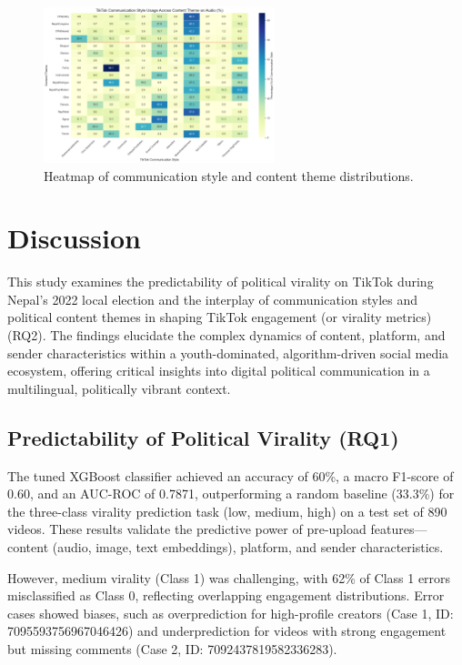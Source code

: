 \documentclass[12pt,a4paper]{report}
\begin{document}
\begin{figure}[ht]
\centering
\includegraphics[width=0.6\textwidth]{figures/RQ2/TikTok_Comm_Heatmap.png}
\caption{Heatmap of communication style and content theme distributions.}
\label{fig:TikTokComm}
\end{figure}


\chapter{Discussion}
\label{chap:discussion}

This study examines the predictability of political virality on TikTok during Nepal’s 2022 local election and the interplay of communication styles and political content themes in shaping TikTok engagement (or virality metrics) (RQ2). The findings elucidate the complex dynamics of content, platform, and sender characteristics within a youth-dominated, algorithm-driven social media ecosystem, offering critical insights into digital political communication in a multilingual, politically vibrant context.

\section{Predictability of Political Virality (RQ1)}
\label{sec:rq1_discussion}
The tuned XGBoost classifier achieved an accuracy of 60\%, a macro F1-score of 0.60, and an AUC-ROC of 0.7871, outperforming a random baseline (33.3\%) for the three-class virality prediction task (low, medium, high) on a test set of 890 videos. These results validate the predictive power of pre-upload features—content (audio, image, text embeddings), platform, and sender characteristics.

However, medium virality (Class 1) was challenging, with 62\% of Class 1 errors misclassified as Class 0, reflecting overlapping engagement distributions. Error cases showed biases, such as overprediction for high-profile creators (Case 1, ID: 7095593756967046426) and underprediction for videos with strong engagement but missing comments (Case 2, ID: 7092437819582336283). 
\end{document}

